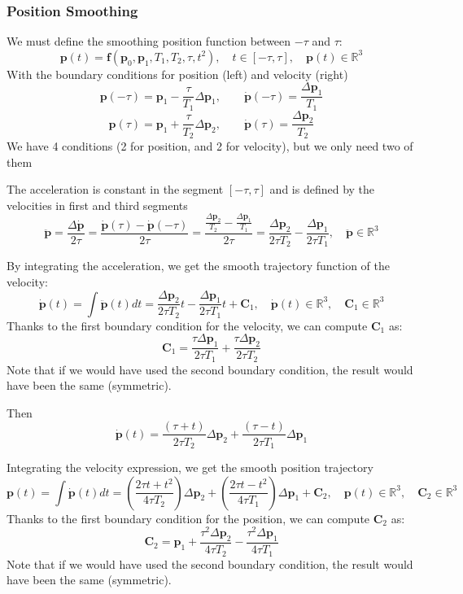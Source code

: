 \documentclass[10pt, aspectratio=169]{beamer}
\theoremstyle{remark}
\theoremstyle{definition}
\begin{document}
\begin{frame}[allowframebreaks]
\frametitle{Position Smoothing}

We must define the smoothing position function between $-\tau$ and $\tau$:
$$
\mathbf{p}(t) = \mathbf{f}(\mathbf{p}_0, \mathbf{p}_1, T_1, T_2, \tau, t^2), \quad t \in [-\tau, \tau], \quad \mathbf{p}(t)\in\mathbb{R}^3
$$
With the boundary conditions for position (left) and velocity (right)
$$
\mathbf{p}(-\tau) = \mathbf{p}_1 - \frac{\tau}{T_1}\Delta \mathbf{p}_1, \quad \quad
\dot{\mathbf{p}}(-\tau) = \frac{\Delta \mathbf{p}_1}{T_1}
$$
$$
\mathbf{p}(\tau) = \mathbf{p}_1 + \frac{\tau}{T_2}\Delta \mathbf{p}_2, \quad \quad
\dot{\mathbf{p}}(\tau) = \frac{\Delta \mathbf{p}_2}{T_2}
$$
\textcolor{uma_pink}{We have 4 conditions (2 for position, and 2 for velocity), but we only need two of them}

The acceleration is constant in the segment $[-\tau, \tau]$ and is defined by the velocities in first and third segments
$$
\ddot{\mathbf{p}} = \frac{\Delta \dot{\mathbf{p}}}{2\tau} = \frac{\dot{\mathbf{p}}(\tau) - \dot{\mathbf{p}}(-\tau)}{2\tau} = \frac{\frac{\Delta \mathbf{p}_2}{T_2} - \frac{\Delta \mathbf{p}_1}{T_1}}{2\tau} = \frac{\Delta \mathbf{p}_2}{2\tau T_2} - \frac{\Delta \mathbf{p}_1}{2\tau T_1}, \quad \ddot{\mathbf{p}}\in\mathbb{R}^3
$$

\framebreak

By integrating the acceleration, we get the smooth trajectory function of the velocity: 
$$
\dot{\mathbf{p}}(t) = \int \ddot{\mathbf{p}}(t) dt = \frac{\Delta \mathbf{p}_2}{2 \tau T_2} t - \frac{\Delta \mathbf{p}_1}{2 \tau T_1} t + \mathbf{C}_1, \quad \dot{\mathbf{p}}(t)\in\mathbb{R}^3, \quad \mathbf{C}_1\in\mathbb{R}^3
$$
Thanks to the first boundary condition for the velocity, we can compute $\mathbf{C}_1$ as:
$$
\mathbf{C}_1 = \frac{\tau \Delta \mathbf{p}_1}{2 \tau T_1} + \frac{\tau \Delta \mathbf{p}_2}{2 \tau T_2}
$$
\textcolor{uma_pink}{Note that if we would have used the second boundary condition, the result would have been the same (symmetric).}

Then
$$
\dot{\mathbf{p}}(t) = \frac{(\tau + t)}{2\tau T_2} \Delta \mathbf{p}_2 + \frac{(\tau - t)}{2\tau T_1} \Delta \mathbf{p}_1
$$

\framebreak

Integrating the velocity expression, we get the smooth position trajectory
$$
\mathbf{p}(t) = \int \dot{\mathbf{p}}(t) dt = \left( \frac{2\tau t + t^2}{4\tau T_2} \right) \Delta \mathbf{p}_2 + \left( \frac{2\tau t - t^2}{4\tau T_1} \right) \Delta \mathbf{p}_1 + \mathbf{C}_2, \quad \mathbf{p}(t)\in\mathbb{R}^3, \quad \mathbf{C}_2\in\mathbb{R}^3
$$
Thanks to the first boundary condition for the position, we can compute $\mathbf{C}_2$ as:
$$
\mathbf{C}_2 = \mathbf{p}_1 + \frac{\tau^2 \Delta \mathbf{p}_2}{4 \tau T_2} - \frac{\tau^2 \Delta \mathbf{p}_1}{4 \tau T_1}
$$
\textcolor{uma_pink}{Note that if we would have used the second boundary condition, the result would have been the same (symmetric).}


\end{frame}
\end{document}
